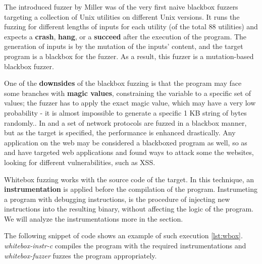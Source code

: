 


The introduced fuzzer by Miller \cite{miller1990empirical} was of the very first naive blackbox fuzzers targeting a collection of Unix utilities on different Unix versions. It runs the fuzzing for different lengths of inputs for each utility (of the total 88 utilities) and expects a \textbf{crash}, \textbf{hang}, or a \textbf{succeed} after the execution of the program. The generation of inputs is by the mutation of the inputs' content, and the target program is a blackbox for the fuzzer. As a result, this fuzzer is a mutation-based blackbox fuzzer.


One of the \textbf{downsides} of the blackbox fuzzing is that the program may face some branches with \textbf{magic values}, constraining the variable to a specific set of values; the fuzzer has to apply the exact magic value, which may have a very low probability - it is almost impossible to generate a specific 1 KB string of bytes randomly.. In \cite{banks2006snooze} and \cite{gascon2015pulsar} a set of network protocols are fuzzed in a blackbox manner, but as the target is specified, the performance is enhanced drastically. Any application on the web may be considered a blackboxed program as well, so as \cite{doupe2012enemy} and \cite{duchene2012xss} have targeted web applications and found ways to attack some the websites, looking for different vulnerabilities, such as XSS.

\vspace{1.5\baselineskip}

Whitebox fuzzing works with the source code of the target. In this technique, an \textbf{instrumentation} is applied before the compilation of the program. Instrumeting a program with debugging instructions, is the procedure of injecting new instructions into the resulting binary, without affecting the logic of the program. We will analyze the instrumentations more in the  section.

The following snippet of code shows an example of such execution \ref{lst:wbox}. \textit{whitebox-instr-c} compiles the program with the required instrumentations and \textit{whitebox-fuzzer} fuzzes the program appropriately.



